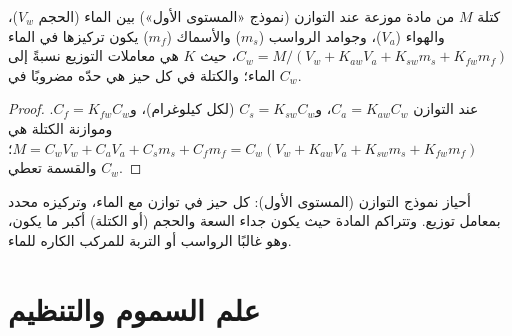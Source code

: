 \begin{proposition}\label{prop:b3:environmental-toxicology:level-one}
كتلة $M$ من مادة موزعة عند التوازن (نموذج «المستوى الأول») بين الماء
(الحجم $V_w$)، والهواء ($V_a$)، وجوامد الرواسب ($m_s$) والأسماك ($m_f$) يكون تركيزها في الماء
$C_w = M/(V_w + K_{aw}V_a + K_{sw}m_s + K_{fw}m_f)$، حيث $K$ هي معاملات التوزيع نسبةً إلى
الماء؛ والكتلة في كل حيز هي حدّه مضروبًا في $C_w$.
\end{proposition}

\begin{proof}
عند التوازن $C_a = K_{aw}C_w$، و$C_s = K_{sw}C_w$ (لكل كيلوغرام)، و$C_f = K_{fw}C_w$. وموازنة الكتلة هي
$M = C_wV_w + C_aV_a + C_sm_s + C_fm_f = C_w(V_w + K_{aw}V_a + K_{sw}m_s + K_{fw}m_f)$؛ والقسمة تعطي $C_w$.
\end{proof}

\begin{omfigure}

{\small أحياز نموذج التوازن (المستوى الأول): كل حيز في
توازن مع الماء، وتركيزه محدد بمعامل توزيع.
وتتراكم المادة حيث يكون جداء السعة والحجم (أو الكتلة)
أكبر ما يكون، وهو غالبًا الرواسب أو التربة للمركب الكاره للماء.}
\end{omfigure}

\section{علم السموم والتنظيم}

